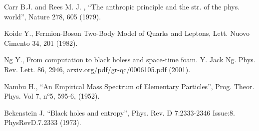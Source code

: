 \documentclass[a4paper,9pt]{article}
\begin{document}
\begin{thebibliography}{99}
 Carr B.J. and Rees M. J. , “The anthropic principle and the str. of the phys. world”, Nature 278, 605 (1979).








 Koide Y., Fermion-Boson Two-Body Model of Quarks and Leptons, Lett. Nuovo Cimento 34, 201 (1982).

 Ng Y., From computation to black holess and space-time foam. Y. Jack Ng. Phys. Rev. Lett. 86, 2946, arxiv.org/pdf/gr-qc/0006105.pdf (2001).

 Nambu H., “An Empirical Mass Spectrum of Elementary Particles”, Prog. Theor. Phys. Vol 7, n°5, 595-6, (1952).








 Bekenstein J. ``Black holes and entropy'', Phys. Rev. D 7:2333-2346 Issue:8. PhysRevD.7.2333 (1973).



















\end{thebibliography}
\end{document}
